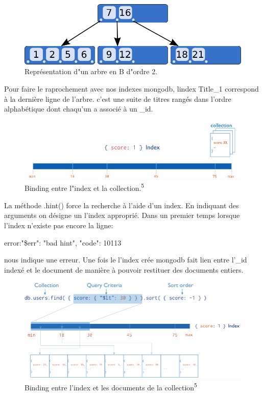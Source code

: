     \begin{figure}[h!]
    \centering
    \includegraphics[scale=0.2]{img/btree.png}
    \caption{Représentation d"un arbre en B d"ordre 2.} 
    \end{figure}
    \par
    Pour faire le raprochement avec nos indexes mongodb, lindex Title\_1 correspond à la dernière ligne de l'arbre. c'est une suite de titres rangés dans l'ordre alphabétique dont chaqu'un a associé à un \_id.
    \begin{figure}[h!]
    \centering
    \includegraphics[scale=0.3]{img/indexmongodb.png}
    \caption{Binding entre l"index et la collection.\textsuperscript{5}}  
    \end{figure}
    \par
    La méthode .hint() force la recherche à l’aide d’un index. En indiquant des arguments on désigne un l’index approprié. Dans un premier temps lorsque l’index n’existe pas encore la ligne: \begin{tt}error:{"\$err": "bad hint", "code": 10113} \end{tt} nous indique une erreur. Une fois le l'index crée mongodb fait lien entre l'\_id indexé et le document de manière à pouvoir restituer des documents entiers.
    \begin{figure}[h!]
    \centering
    \includegraphics[scale=0.3]{img/indextocoll.png}
    \caption{Binding entre l'index et les documents de la collection\textsuperscript{5}} 
    \end{figure}

{\let\thefootnote\relax{}}
        {\let\thefootnote\relax{}}
